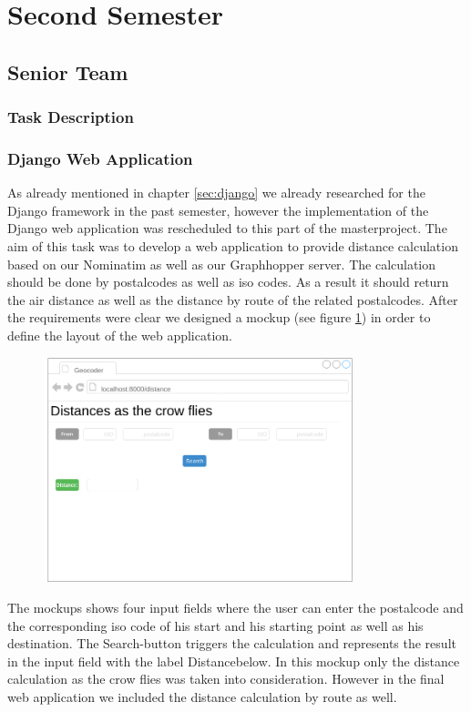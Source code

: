 
\section{Second Semester}

\subsection{Senior Team}
\subsubsection{Task Description}
\subsubsection{Django Web Application}
As already mentioned in chapter \ref{sec:django} we already researched for the Django framework in the past semester, however the implementation of the Django web application was rescheduled to this part of the masterproject.
The aim of this task was to develop a web application to provide distance calculation based on our Nominatim as well as our Graphhopper server. The calculation should be done by postalcodes as well as iso codes. As a result it should return the air distance as well as the distance by route of the related postalcodes. After the requirements were clear we designed a mockup (see figure \ref{fig:mockup}) in order to define the layout of the web application. 
\begin{figure}[H]
\centering
\includegraphics[width=0.8\textwidth]{img/mockup}
\label{fig:mockup}
\end{figure}
The mockups shows four input fields where the user can enter the postalcode and the corresponding iso code of his start and his starting point as well as his destination. The \glqq Search\grqq-button triggers the calculation and represents the result in the input field with the label \glqq Distance\grqq below. In this mockup only the distance calculation as the crow flies was taken into consideration. However in the final web application we included the distance calculation by route as well.\\
